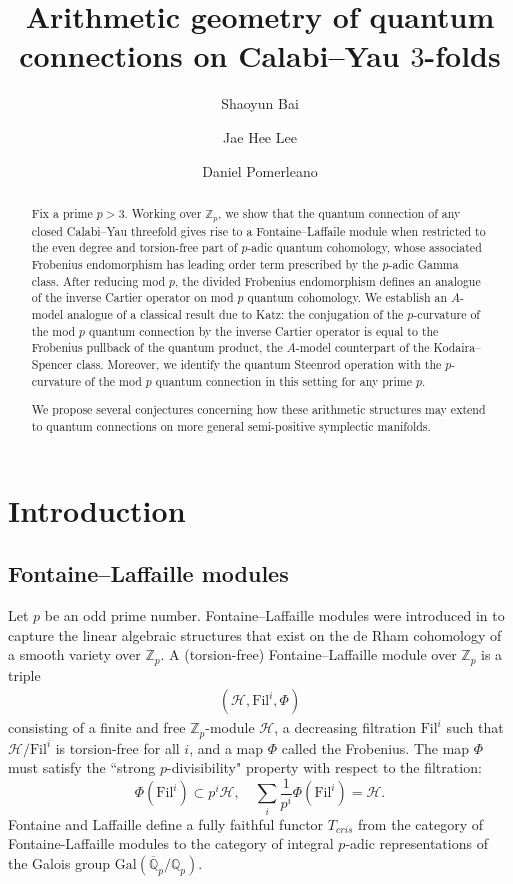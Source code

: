 \documentclass[reqno]{amsart}
\title[]{Arithmetic geometry of quantum connections on Calabi--Yau $3$-folds}
\author{Shaoyun Bai}
\author{Jae Hee Lee}
\author{Daniel Pomerleano}
\numberwithin{equation}{section}
\numberwithin{equation}{section}
\numberwithin{equation}{section}
\theoremstyle{definition}
\theoremstyle{remark}
\theoremstyle{remark}
\newcommand{\calH}{\mathcal{H}}
\begin{document}
\maketitle

\begin{abstract}
Fix a prime $p > 3$. Working over $\mathbb{Z}_p$, we show that the quantum connection of any closed Calabi--Yau threefold gives rise to a Fontaine--Laffaile module when restricted to the even degree and torsion-free part of $p$-adic quantum cohomology, whose associated Frobenius endomorphism has leading order term prescribed by the $p$-adic Gamma class. After reducing mod $p$, the divided Frobenius endomorphism defines an analogue of the inverse Cartier operator on mod $p$ quantum cohomology. We establish an $A$-model analogue of a classical result due to Katz: the conjugation of the $p$-curvature of the mod $p$ quantum connection by the inverse Cartier operator is equal to the Frobenius pullback of the quantum product, the $A$-model counterpart of the Kodaira--Spencer class. Moreover, we identify the quantum Steenrod operation with the $p$-curvature of the mod $p$ quantum connection in this setting for any prime $p$.

We propose several conjectures concerning how these arithmetic structures may extend to quantum connections on more general semi-positive symplectic manifolds.
\end{abstract}


\setcounter{tocdepth}{1}
\tableofcontents
\section{Introduction}
\subsection{Fontaine--Laffaille modules}
Let $p$ be an odd prime number. Fontaine--Laffaille modules were introduced in \cite{Fontaine_Laffaille} to capture the linear algebraic structures that exist on the de Rham cohomology of a smooth variety over $\mathbb{Z}_p$.  A (torsion-free) Fontaine--Laffaille module over $\mathbb{Z}_p$ is a triple 
\begin{align} \label{eq:strongdivisibility}
(\calH, \mathrm{Fil}^i, \Phi) \end{align}
consisting of a finite and free $\mathbb{Z}_p$-module $\calH$, a decreasing filtration $\mathrm{Fil}^i$ such that $\calH/\mathrm{Fil}^i$ is torsion-free for all $i$, and a map $\Phi$ called the Frobenius. The map $\Phi$ must satisfy the ``strong $p$-divisibility" property with respect to the filtration:  
    \[
    \Phi(\mathrm{Fil}^i) \subset p^i \calH, \quad \sum_{i} \frac{1}{p^i} \Phi(\mathrm{Fil}^i) = \calH.
    \] Fontaine and Laffaille define a fully faithful functor $T_{cris}$ from the category of Fontaine-Laffaille modules to the category of integral $p$-adic representations of the Galois group $\mathrm{Gal}(\overline{\mathbb{Q}}_p/\mathbb{Q}_p).$ 
\end{document}
